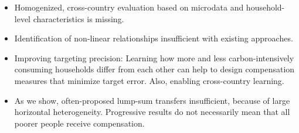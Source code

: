 \documentclass[12pt, a4paper]{article}
\begin{document}
\begin{itemize}
  \item Homogenized, cross-country evaluation based on microdata and household-level characteristics is missing.
  \item Identification of non-linear relationships insufficient with existing approaches.
  \item Improving targeting precision: Learning how more and less carbon-intensively consuming households differ from each other can help to design compensation measures that minimize target error. Also, enabling cross-country learning.
  \item As we show, often-proposed lump-sum transfers insufficient, because of large horizontal heterogeneity. Progressive results do not necessarily mean that all poorer people receive compensation.


\end{itemize}
\end{document}
